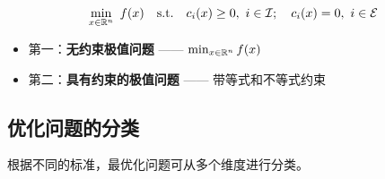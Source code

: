 \begin{definition}[最优化问题]
\[
\min_{x \in \mathbb{R}^n}\ f(x)\quad \text{s.t.}\quad c_i(x) \geq 0,\ i \in \mathcal{I};\quad c_i(x) = 0,\ i \in \mathcal{E}
\]
\begin{itemize}
    \item 第一：\textbf{无约束极值问题} —— $\min_{x \in \mathbb{R}^n} f(x)$
    \item 第二：\textbf{具有约束的极值问题} —— 带等式和不等式约束
\end{itemize}
\end{definition}

\subsection{优化问题的分类}

根据不同的标准，最优化问题可从多个维度进行分类。

